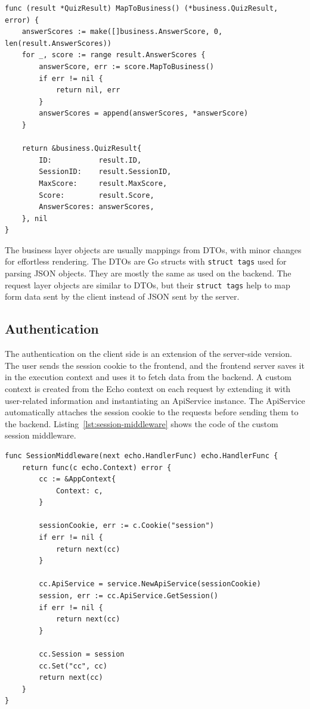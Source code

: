\begin{lstlisting}[caption=Mapping from external to business,label=lst:mapping-example]
func (result *QuizResult) MapToBusiness() (*business.QuizResult, error) {
    answerScores := make([]business.AnswerScore, 0, len(result.AnswerScores))
    for _, score := range result.AnswerScores {
        answerScore, err := score.MapToBusiness()
        if err != nil {
            return nil, err
        }
        answerScores = append(answerScores, *answerScore)
    }

    return &business.QuizResult{
        ID:           result.ID,
        SessionID:    result.SessionID,
        MaxScore:     result.MaxScore,
        Score:        result.Score,
        AnswerScores: answerScores,
    }, nil
}
\end{lstlisting}

The business layer objects are usually mappings from DTOs, with minor changes for effortless rendering. The DTOs are Go structs with \texttt{struct tags} used for parsing JSON objects. They are mostly the same as used on the backend. The request layer objects are similar to DTOs, but their \texttt{struct tags} help to map form data sent by the client instead of JSON sent by the server.

\subsection{Authentication}\label{subsec:frontend-authentication}

The authentication on the client side is an extension of the server-side version. The user sends the session cookie to the frontend, and the frontend server saves it in the execution context and uses it to fetch data from the backend. A custom context is created from the Echo context on each request by extending it with user-related information and instantiating an ApiService instance. The ApiService automatically attaches the session cookie to the requests before sending them to the backend. Listing~\ref{lst:session-middleware} shows the code of the custom session middleware.

\begin{lstlisting}[caption=Session middleware code,label=lst:session-middleware]
func SessionMiddleware(next echo.HandlerFunc) echo.HandlerFunc {
	return func(c echo.Context) error {
		cc := &AppContext{
			Context: c,
		}

		sessionCookie, err := c.Cookie("session")
		if err != nil {
			return next(cc)
		}

		cc.ApiService = service.NewApiService(sessionCookie)
		session, err := cc.ApiService.GetSession()
		if err != nil {
			return next(cc)
		}

		cc.Session = session
		cc.Set("cc", cc)
		return next(cc)
	}
}
\end{lstlisting}

